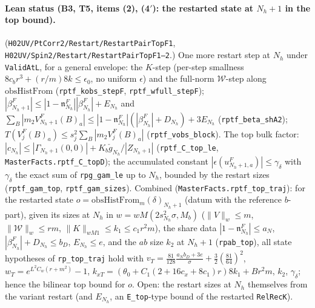 \documentclass[11pt]{amsart}
\theoremstyle{definition}
\theoremstyle{remark}
\numberwithin{equation}{section}
\begin{document}
\paragraph{Lean status (B3, T5, items (2), (4$'$): the restarted state at $N_h+1$ in the top bound).}
(\texttt{H02UV/PtCorr2/Restart/RestartPairTopF1}, \texttt{H02UV/Spin2/Restart/RestartPairTopF1--2}.) One more restart step at $N_h$ under
\texttt{ValidAtL}, for a general envelope: the $K$-step (per-step smallness $8c_br^3+(r/m)8k\le\epsilon_0$, no
uniform $\epsilon$) and the full-norm $\mathcal W$-step along $\mathrm{obsHistFrom}$ (\texttt{rptf\_kobs\_stepF},
\texttt{rptf\_wfull\_stepF}); $|\beta^F_{N_h+1}|\le|1-\mathfrak n^F_{N_h}||\beta^F_{N_h}|+E_{N_h}$ and
$\sum_B|m_2V^F_{N_h+1}(B)_a|\le|1-\mathfrak n^F_{N_h}|(|\beta^F_{N_h}|+D_{N_h})+3E_{N_h}$ (\texttt{rptf\_beta\_shA2});
$T(V^F_j(B)_a)\le s_j^2\sum_B|m_2V^F_j(B)_a|$ (\texttt{rptf\_vobs\_block}). The top bulk factor:
$|c_{N_h}|\le|\Gamma_{N_h+1}(0,0)|+K_b\check g_{N_h}/|Z_{N_h+1}|$ (\texttt{rptf\_C\_top\_le},
\texttt{MasterFacts.rptf\_C\_topD}); the accumulated constant $|\epsilon(u^F_{N_h+1,a})|\le\gamma_\delta$ with
$\gamma_\delta$ the exact sum of \texttt{rpg\_gam\_le} up to $N_h$, bounded by the restart sizes
(\texttt{rptf\_gam\_top}, \texttt{rptf\_gam\_sizes}). Combined (\texttt{MasterFacts.rptf\_top\_traj}): for the
restarted state $o=\mathrm{obsHistFrom}_{m}(\delta)_{N_h+1}$ (datum with the reference $b$-part), given its sizes
at $N_h$ in $w=wM(2s_{N_h}^2\sigma,M_b)$ ($\|V\|_w\le m$, $\|\mathcal W\|_w\le rm$, $\|K\|_{wM1}\le k_1\le c_1r^2m$),
the share data $|1-\mathfrak n^F_{N_h}|\le a_N$, $|\beta^F_{N_h}|+D_{N_h}\le b_D$, $E_{N_h}\le e$, and the $ab$ size $k_2$
at $N_h+1$ (\texttt{rpab\_top}), all state hypotheses of \texttt{rp\_top\_traj} hold with
$v_T=\frac{81}{128}\frac{a_Nb_D+3e}\sigma+\frac32(\frac{81}{64})^2$, $w_T=e^{L^2C_w(r+m^2)}-1$,
$k_{xT}=(\theta_0+C_1(2+16c_x+8c_1)r)8k_1+Br^2m$, $k_2$, $\gamma_\delta$; hence the bilinear top bound for $o$.
Open: the restart sizes at $N_h$ themselves from the variant restart (and $E_{N_h}$, an \texttt{E\_top}-type
bound of the restarted \texttt{RelRecK}).
\end{document}
